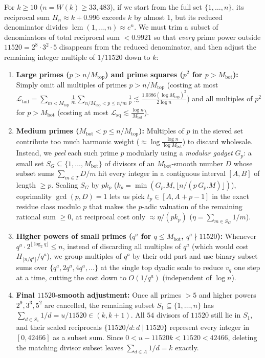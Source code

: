 \documentclass[11pt,a4paper]{amsart}
\theoremstyle{remark}
\begin{document}
For $k \ge 10$ ($n = W(k) \ge 33{,}483$), if we start from the full set $\{1, \dots, n\}$, its reciprocal sum $H_n \approx k + 0.996$ exceeds $k$ by almost $1$, but its reduced denominator divides $\operatorname{lcm}(1, \dots, n) \approx e^n$. We must trim a subset of denominators of total reciprocal sum $< 0.9921$ so that \emph{every} prime power outside $11520 = 2^8 \cdot 3^2 \cdot 5$ disappears from the reduced denominator, and then adjust the remaining integer multiple of $1/11520$ down to $k$:
\begin{enumerate}
\item \textbf{Large primes ($p > n / M_{\mathrm{top}}$) and prime squares ($p^2$ for $p > M_{\mathrm{bot}}$):} Simply omit all multiples of primes $p > n / M_{\mathrm{top}}$ (costing at most $\mathcal{L}_{\mathrm{tail}} = \sum_{m < M_{\mathrm{top}}} \frac{1}{m}\sum_{n/M_{\mathrm{top}} < p \le n/m} \frac{1}{p} \lesssim \frac{1.0386 (\log M_{\mathrm{top}})^2}{2 \log n}$) and all multiples of $p^2$ for $p > M_{\mathrm{bot}}$ (costing at most $\mathcal{L}_{\mathrm{sq}} \lesssim \frac{\log n}{M_{\mathrm{bot}}}$).
\item \textbf{Medium primes ($M_{\mathrm{bot}} < p \le n / M_{\mathrm{top}}$):} Multiples of $p$ in the sieved set contribute too much harmonic weight ($\approx \log\frac{\log n}{\log M_{\mathrm{bot}}}$) to discard wholesale. Instead, we \emph{peel} each such prime $p$ modularly using a \emph{modular gadget} $G_p$: a small set $S_G \subseteq \{1, \dots, M_{\mathrm{bot}}\}$ of divisors of an $M_{\mathrm{bot}}$-smooth number $D$ whose subset sums $\sum_{m \in T} D/m$ hit every integer in a contiguous interval $[A, B]$ of length $\ge p$. Scaling $S_G$ by $p k_p$ ($k_p = \min(G_p.M, \lfloor n/(p \, G_p.M)\rfloor)$), coprimality $\gcd(p, D) = 1$ lets us pick $t_p \in [A, A + p - 1]$ in the exact residue class modulo $p$ that makes the $p$-adic valuation of the remaining rational sum $\ge 0$, at reciprocal cost only $\approx \eta / (p k_p)$ ($\eta = \sum_{m \in S_G} 1/m$).
\item \textbf{Higher powers of small primes ($q^a$ for $q \le M_{\mathrm{bot}}$, $q^a \nmid 11520$):} Whenever $q^a \cdot 2^{\lfloor \log_2 q \rfloor} \le n$, instead of discarding all multiples of $q^a$ (which would cost $H_{\lfloor n/q^a\rfloor}/q^a$), we group multiples of $q^a$ by their odd part and use binary subset sums over $\{q^a, 2 q^a, 4 q^a, \dots\}$ at the single top dyadic scale to reduce $v_q$ one step at a time, cutting the cost down to $O(1 / q^a)$ (independent of $\log n$).
\item \textbf{Final $11520$-smooth adjustment:} Once all primes $> 5$ and higher powers $2^9, 3^3, 5^2$ are cancelled, the remaining subset $S_1 \subseteq \{1, \dots, n\}$ has $\sum_{d \in S_1} 1/d = u / 11520 \in (k, k + 1)$. All $54$ divisors of $11520$ still lie in $S_1$, and their scaled reciprocals $\{11520 / d : d \mid 11520\}$ represent every integer in $[0, 42466]$ as a subset sum. Since $0 < u - 11520 k < 11520 < 42466$, deleting the matching divisor subset leaves $\sum_{d \in A} 1/d = k$ exactly.
\end{enumerate}
\end{document}

